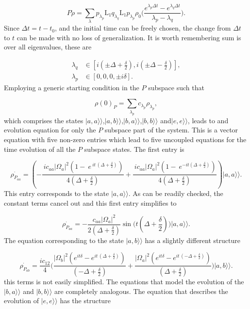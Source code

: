 \documentclass[12pt]{article}
\newcommand{\superket}[1]{|#1\rangle\rangle}
\begin{document}
\begin{equation}
    P\dot{\rho}=\sum_{\lambda} p_{\lambda_p} \mathrm{L}_1  q_{\lambda_q}\mathrm{L}_1p_{\lambda_p} \rho_0\Bigg(\frac{e^{\lambda_p\Delta t}-e^{\lambda_q \Delta t}}{\lambda_p-\lambda_q}\Bigg).
\end{equation} Since $\Delta t=t-t_0$, and the initial time can be freely chosen, the change from $\Delta t$ to $t$ can be made with no loss of generalization. It is worth remembering sum is over all eigenvalues, these are

\begin{align*}
    \lambda_q &\in [ i(\pm\Delta+\frac{\delta}{2}), i(\pm\Delta - \frac{\delta}{2} )],\\
    \lambda_p &\in [0,0,0, \pm i\delta].
\end{align*} Employing a generic starting condition in the $P$ subspace such that

\begin{equation}
    \rho(0)_P = \sum_{\lambda_p} c_{\lambda_p} \rho_{\lambda_p},
\end{equation} which comprises the states $\superket{a,a}$,$\superket{a,b}$,$\superket{b,a}$,$\superket{b,b}$ and$\superket{e,e}$, leads to and evolution equation for only the $P$ subspace part of the system. This is a vector equation with five non-zero entries which lead to five uncoupled equations for the time evolution of all the $P$ subspace states. The first entry is

\begin{equation}
    \dot{\rho_{P_{aa}}} = (-\frac{\ i c_{aa} |\Omega_a|^2 ( 1-{{\ e}^{\ i t\, ( \Delta+\frac{\delta }{2} ) }}) }{4 (\Delta+\frac{\delta }{2} ) }+\frac{\ i c_{aa} |\Omega_a|^2 ( 1-{{\ e}^{ -i t ( \Delta+\frac{\delta }{2} ) }}) }{4 (\Delta+ \frac{\delta }{2} ) })\superket{a,a}.
\end{equation} This entry corresponds to the state $\superket{a,a}$. As can be readily checked, the constant terms cancel out and this first entry simplifies to

\begin{equation}
    \dot{\rho_{P_{aa}}} = -\frac{c_{aa}|\Omega_a|^2}{2(\Delta + \frac{\delta}{2})}\sin{\big( t(\Delta+\frac{\delta}{2})\big)}\superket{a,a}.
\end{equation} The equation corresponding to the state $\superket{a,b}$ has a slightly different structure

\begin{equation}
   \dot{\rho_{P_{ab}}} =\frac{i{c_{\ensuremath{\mathrm{12}}}}}{4}\Bigg(\frac{ |\Omega_b|^2 ( {{ e}^{ i t \delta }}-{{ e}^{ i t\, ( \Delta+\frac{\delta }{2} ) }}) }{ ( -\Delta + \frac{\delta}{2}  )  }+\frac{|\Omega_a|^2( {{ e}^{ i t \delta }}-{{ e}^{ i t\, (-\Delta+ \frac{\delta }{2} ) }}) }{ ( \Delta + \frac{\delta}{2}) }\Bigg)\superket{a,b}.
\end{equation} this terms is not easily simplified. The equations that model the evolution of the $\superket{b,a}$ and $\superket{b,b}$ are completely analogous. The equation that describes the evolution of $\superket{e,e}$ has the structure
\end{document}
